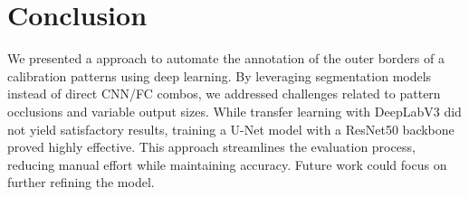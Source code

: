 \section{Conclusion}

We presented a approach to automate the annotation of the outer borders of a calibration patterns using deep learning. By leveraging
segmentation models instead of direct CNN/FC combos, we addressed challenges related to pattern occlusions and variable output sizes.
While transfer learning with DeepLabV3 did not yield satisfactory results, training a U-Net model with a ResNet50 backbone proved
highly effective. This approach streamlines the evaluation process, reducing manual effort while maintaining accuracy. Future work
could focus on further refining the model.